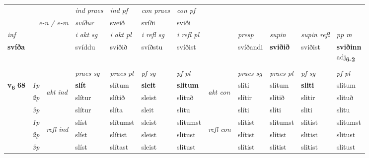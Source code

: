 \begin{longtable}[l]{X>{\footnotesize\itshape}llXXXXlXXXX}
   && &  \textit{ind praes} & \textit{ind pf} & \textit{con praes} & \textit{con pf} \\*
\multicolumn{3}{r}{\textit{e-n  /  e-m}} & svíður & sveið & svíði & sviði \\*

\cmidrule{4-7}
   {\textit{inf}} & &  & \textit{i akt sg} & \textit{i akt pl} & \textit{i refl sg} & \textit{i refl pl} && \textit{presp} & \textit{supin} & \textit{supin refl} & \textit{pp m} \\*
  {\textbf{svíða}} & && svíddu  & svíðið & svíðstu & svíðist && svíðandi &  \textbf{sviðið} & sviðist & \specialcell{\textbf{sviðinn} \\ adj\textbf{\textsubscript{6-2}}} \\*

\midrule

  & \\
   \midrule
 & &   & \textit{praes sg}  & \textit{praes pl}    & \textit{ pf sg} & \textit{pf pl} & & \textit{praes sg}  & \textit{praes pl}    & \textit{pf sg} & \textit{pf pl }  \\ \cmidrule{4-7} \cmidrule{9-12}
 \multirow{2}{*}{{{\textbf{v{\textsubscript{6}}} \Large{\textbf{68}}}}}  & 1p & \multirow{3}{*}{\begin{turn}{90}\textit{akt ind}\end{turn}} & \textbf{slít} & slítum & \textbf{sleit} & \textbf{slitum} & \multirow{3}{*}{\begin{turn}{90}\textit{akt con}\end{turn}} &slíti & slítum & \textbf{sliti} & slitum\\*
 & 2p &  &  slítur  & slítið & sleist & slituð & & slítir & slítið & slitir & slituð \\*
 & 3p &  & slítur & slíta & sleit & slitu & & slíti & slíti& sliti & slitu \\*
\cmidrule{4-7} \cmidrule{9-12}
 & 1p & \multirow{3}{*}{\begin{turn}{90}\textit{refl ind}\end{turn}}  & slíst & slítumst & sleist & slitumst & \multirow{3}{*}{\begin{turn}{90}\textit{refl con}\end{turn}}  &slítist & slítumst & slitist & slitumst \\*
 & 2p &  & slíst & slítist & sleist & slitust & &slítist & slítist & slitist & slitust \\*
 & 3p  & & slíst & slítast & sleist & slitust & & slítist & slítist& slitist & slitust \\*
\cmidrule{4-7} \cmidrule{9-12}


\end{longtable}
